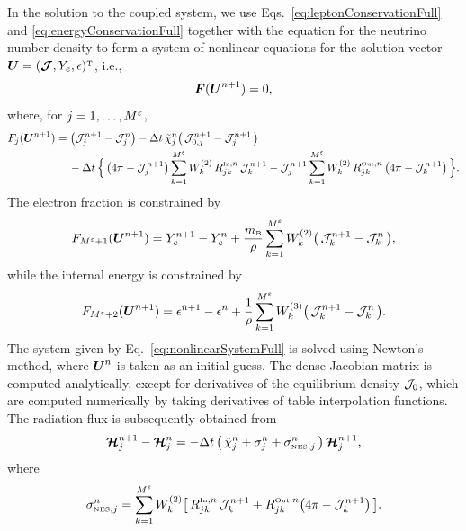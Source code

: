\documentclass[10pt,preprint]{aastex}
\newcommand{\NES}{\mbox{\tiny NES}}
\begin{document}
In the solution to the coupled system, we use Eqs.~\eqref{eq:leptonConservationFull} and \eqref{eq:energyConservationFull} together with the equation for the neutrino number density to form a system of nonlinear equations for the solution vector $\boldsymbol{U}=(\boldsymbol{\mathcal{J}},Y_{e},\epsilon)^{\mbox{\tiny T}}$, i.e.,
\begin{equation}
  \boldsymbol{F}(\boldsymbol{U}^{n+1})=0,
  \label{eq:nonlinearSystemFull}
\end{equation}
where, for $j=1,\ldots,M^{\varepsilon}$,
\begin{align}
  F_{j}(\boldsymbol{U}^{n+1})
  &=\big(\mathcal{J}_{j}^{n+1}-\mathcal{J}_{j}^{n}\big)-\Delta t\,\tilde{\chi}_{j}^{n}\big(\,\mathcal{J}_{0,j}^{n+1}-\mathcal{J}_{j}^{n+1}\,\big) \nonumber \\
  &\hspace{12pt}
  -\Delta t\,\Big\{\,
    \big(4\pi-\mathcal{J}_{j}^{n+1}\big)\sum_{k=1}^{M^{\varepsilon}}W_{k}^{(2)}\,R_{jk}^{\mbox{\tiny In},n}\,\mathcal{J}_{k}^{n+1}
    -\mathcal{J}_{j}^{n+1}\sum_{k=1}^{M^{\varepsilon}}W_{k}^{(2)}\,R_{jk}^{\mbox{\tiny Out},n}\,\big(4\pi-\mathcal{J}_{k}^{n+1}\big)\,\Big\}.
\end{align}
The electron fraction is constrained by
\begin{equation}
  F_{M^{\varepsilon}+1}(\boldsymbol{U}^{n+1})
  =Y_{e}^{n+1}-Y_{e}^{n}+\frac{m_{\mbox{\tiny B}}}{\rho}\sum_{k=1}^{M^{\varepsilon}}W_{k}^{(2)}\big(\,\mathcal{J}_{k}^{n+1}-\mathcal{J}_{k}^{n}\,\big),
\end{equation}
while the internal energy is constrained by
\begin{equation}
  F_{M^{\varepsilon}+2}(\boldsymbol{U}^{n+1})
  =\epsilon^{n+1}-\epsilon^{n}+\frac{1}{\rho}\sum_{k=1}^{M^{\varepsilon}}W_{k}^{(3)}\big(\,\mathcal{J}_{k}^{n+1}-\mathcal{J}_{k}^{n}\,\big).  
\end{equation}
The system given by Eq.~\eqref{eq:nonlinearSystemFull} is solved using Newton's method, where $\boldsymbol{U}^{n}$ is taken as an initial guess.  
The dense Jacobian matrix is computed analytically, except for derivatives of the equilibrium density $\mathcal{J}_{0}$, which are computed numerically by taking derivatives of table interpolation functions.  
The radiation flux is subsequently obtained from
\begin{equation}
  \bcH_{j}^{n+1}-\bcH_{j}^{n}
  =-\dt\,\big(\,\tilde{\chi}_{j}^{n}+\sigma_{j}^{n}+\sigma_{\NES,j}^{n}\,\big)\,\bcH_{j}^{n+1},
\end{equation}
where
\begin{equation}
  \sigma_{\NES,j}^{n}
  =\sum_{k=1}^{M^{\epsilonNu}}W_{k}^{(2)}\big[\,R_{jk}^{\In,n}\,\cJ_{k}^{n+1}+R_{jk}^{\Out,n}\big(4\pi-\cJ_{k}^{n+1}\big)\,\big].
\end{equation}
\end{document}
